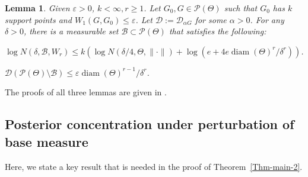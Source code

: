 \documentclass[MSNbibl,number,citesort]{arxbj}
\newtheorem{lemma}{Lemma}[section]
\newcommand{\Bcal}{\mathcal{B}}
\newcommand{\Dcal}{\mathcal{D}}
\newcommand{\Pcal}{\mathscr{P}}
\newcommand{\DP}{\mathscr{D}}
\begin{document}
%
\begin{lemma}
\label{Lem-DP-Approx-2}
Given $\varepsilon> 0$, $k < \infty, r\geq1$.
Let $G_0, G \in\Pcal(\Theta)$ such that $G_0$ has $k$ support
points and $W_1(G,G_0) \leq\varepsilon$.
Let $\Dcal:= \DP_{\alpha G}$ for some $\alpha> 0$. For any $\delta> 0$,
there is a measurable set $\Bcal\subset\Pcal(\Theta)$ that
satisfies the
following:
%
\begin{longlist}[(a)]
%
\item[(a)] $\log N(\delta, \Bcal, W_r) \leq k(\log N(\delta/4,
\Theta,
\|\cdot\|)
+ \log(e+4e\operatorname{diam}(\Theta)^r/\delta^r))$.
%
\item[(b)] $\Dcal(\Pcal(\Theta) \setminus\Bcal) \leq\varepsilon
\operatorname{diam}
(\Theta)^{r-1}/\delta^r$.
\end{longlist}
%
\end{lemma}

The proofs of all three lemmas are given in %
\cite{Nguyen-hdpsupp}.

\subsection{Posterior concentration under perturbation of base measure}
\label{sec-proof-perturb}

Here, we state a key result that is needed in the proof
of Theorem~\ref{Thm-main-2}.
%
\end{document}

